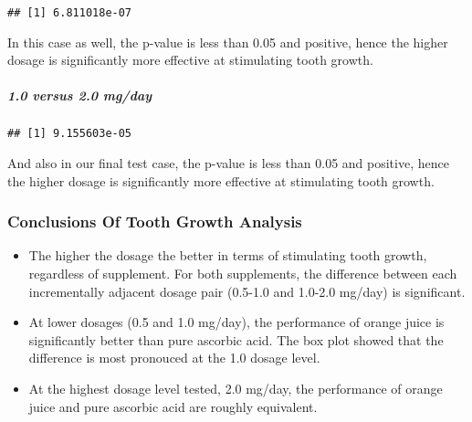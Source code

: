 \documentclass[]{article}
\newenvironment{Shaded}{\begin{snugshade}}{\end{snugshade}}
\newcommand{\KeywordTok}[1]{\textcolor[rgb]{0.13,0.29,0.53}{\textbf{#1}}}
\newcommand{\FloatTok}[1]{\textcolor[rgb]{0.00,0.00,0.81}{#1}}
\newcommand{\StringTok}[1]{\textcolor[rgb]{0.31,0.60,0.02}{#1}}
\newcommand{\OperatorTok}[1]{\textcolor[rgb]{0.81,0.36,0.00}{\textbf{#1}}}
\newcommand{\NormalTok}[1]{#1}
\let\oldsubparagraph\subparagraph
\renewcommand{\subparagraph}[1]{\oldsubparagraph{#1}\mbox{}}
\begin{document}
\begin{verbatim}
## [1] 6.811018e-07
\end{verbatim}

In this case as well, the p-value is less than 0.05 and positive, hence
the higher dosage is significantly more effective at stimulating tooth
growth.

\subparagraph{1.0 versus 2.0 mg/day}\label{versus-2.0-mgday-1}

\begin{Shaded}
\end{Shaded}

\begin{verbatim}
## [1] 9.155603e-05
\end{verbatim}

And also in our final test case, the p-value is less than 0.05 and
positive, hence the higher dosage is significantly more effective at
stimulating tooth growth.

\subsubsection{Conclusions Of Tooth Growth
Analysis}\label{conclusions-of-tooth-growth-analysis}

\begin{itemize}
\item
  The higher the dosage the better in terms of stimulating tooth growth,
  regardless of supplement. For both supplements, the difference between
  each incrementally adjacent dosage pair (0.5-1.0 and 1.0-2.0 mg/day)
  is significant.
\item
  At lower dosages (0.5 and 1.0 mg/day), the performance of orange juice
  is significantly better than pure ascorbic acid. The box plot showed
  that the difference is most pronouced at the 1.0 dosage level.
\item
  At the highest dosage level tested, 2.0 mg/day, the performance of
  orange juice and pure ascorbic acid are roughly equivalent.
\end{itemize}
\end{document}
